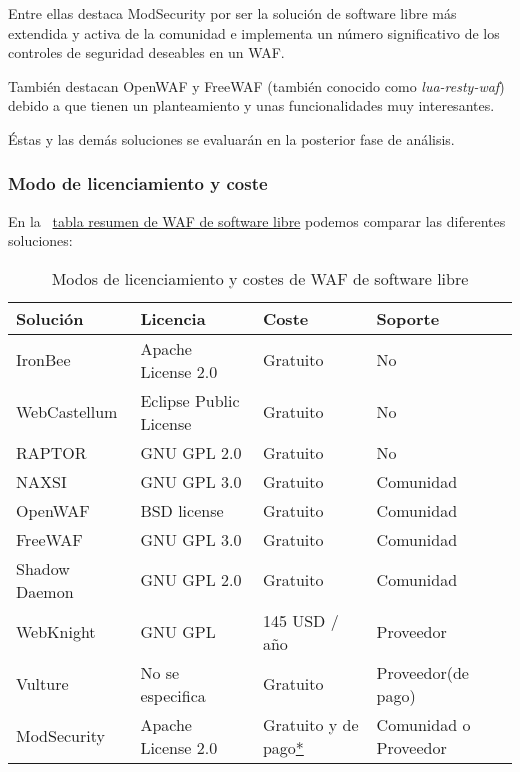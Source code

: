\par Entre ellas destaca ModSecurity por ser la solución de software libre más extendida y activa de la comunidad e implementa un número
significativo de los controles de seguridad deseables en un WAF.
\par También destacan OpenWAF y FreeWAF (también conocido como {\em lua-resty-waf}) debido a que tienen un planteamiento y unas
funcionalidades muy interesantes.
\par Éstas y las demás soluciones se evaluarán en la posterior fase de análisis.


\subsubsection{Modo de licenciamiento y coste}
En la {~\hyperref[tab:waflibre]{tabla resumen de WAF de software libre}} podemos comparar las diferentes soluciones:

\begin{table}[h!]
  \centering
  \label{tab:waflibre}
  \begin{tabular}{llll}
    \hline
     Solución             & Licencia                        & Coste                           & Soporte                         \\
    \hline
     IronBee              & Apache License 2.0              & Gratuito                        & No                              \\
     WebCastellum					& Eclipse Public License          & Gratuito                        & No                              \\
     RAPTOR					      & GNU GPL 2.0                     & Gratuito                        & No                              \\
     NAXSI					      & GNU GPL 3.0                     & Gratuito                        & Comunidad                       \\
     OpenWAF					    & BSD license                     & Gratuito                        & Comunidad                       \\
     FreeWAF					    & GNU GPL 3.0                     & Gratuito                        & Comunidad                       \\
     Shadow Daemon				& GNU GPL 2.0                     & Gratuito                        & Comunidad                       \\
     WebKnight		        & GNU GPL                         & 145 USD / año                   & Proveedor                       \\
     Vulture					    & No se especifica                & Gratuito                        & Proveedor(de pago)              \\
     ModSecurity 					& Apache License 2.0              & Gratuito y de pago\hyperlink{modlic}{*}  & Comunidad o Proveedor  \\
    \hline
  \end{tabular}
  \caption{Modos de licenciamiento y costes de WAF de software libre}
\end{table}

